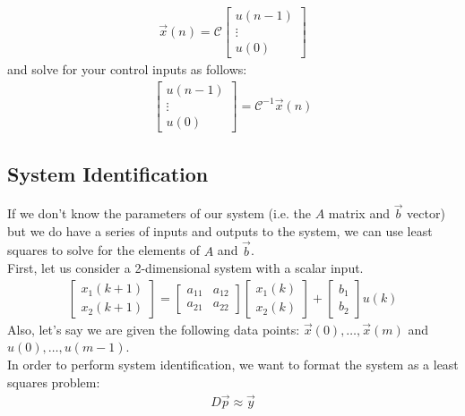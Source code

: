 \begin{align*}
    \vec{x}(n) = \mathcal{C} \begin{bmatrix}
        u(n - 1) \\ \vdots \\ u(0)
    \end{bmatrix}
\end{align*}
and solve for your control inputs as follows:
\begin{align*}
    \begin{bmatrix}
        u(n - 1) \\ \vdots \\ u(0)
    \end{bmatrix} = \mathcal{C}^{-1} \vec{x}(n)
\end{align*}

\subsection*{System Identification}
If we don't know the parameters of our system (i.e. the $A$ matrix and $\vec{b}$ vector) but we do have a series of inputs and outputs to the system, we can use least squares to solve for the elements of $A$ and $\vec{b}$. \\
\newline
First, let us consider a 2-dimensional system with a scalar input.
\begin{align*}
    \begin{bmatrix}
        x_1(k + 1) \\ x_2(k + 1)
    \end{bmatrix} = \begin{bmatrix}
        a_{11} & a_{12} \\
        a_{21} & a_{22}
    \end{bmatrix} \begin{bmatrix}
        x_1(k) \\ x_2(k)
    \end{bmatrix} + \begin{bmatrix}
        b_1 \\ b_2
    \end{bmatrix} u(k)
\end{align*}
Also, let's say we are given the following data points: $\vec{x}(0), \dots, \vec{x}(m)$ and $u(0), \dots, u(m - 1)$. \\
\newline
In order to perform system identification, we want to format the system as a least squares problem:
\begin{align*}
    D\vec{p} \approx \vec{y}
\end{align*}
